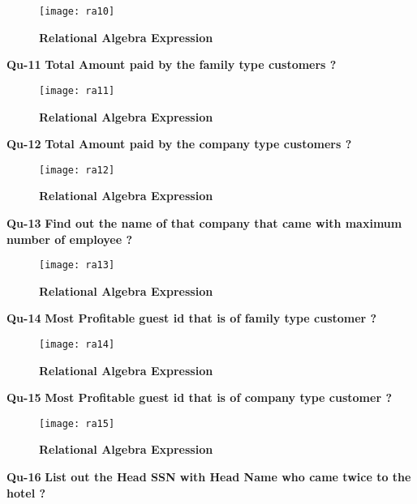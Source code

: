 \documentclass[a4,12pt]{report}
\begin{document}
\begin{figure}[hbtp]
\centering
\texttt{[image: ra10]}
\caption{\textbf{{\color{red}Relational Algebra Expression}}}
\end{figure}

\newpage
\textbf{Qu-11} \textbf{ Total Amount paid by the family type customers ? }\\

\begin{figure}[hbtp]
\centering
\texttt{[image: ra11]}
\caption{\textbf{{\color{red}Relational Algebra Expression}}}
\end{figure}

\newpage
\textbf{Qu-12} \textbf{ Total Amount paid by the company type customers ? }\\

\begin{figure}[hbtp]
\centering
\texttt{[image: ra12]}
\caption{\textbf{{\color{red}Relational Algebra Expression}}}
\end{figure}

\textbf{Qu-13} \textbf{ Find out the name of that company that came with maximum number of employee ? }\\

\begin{figure}[hbtp]
\centering
\texttt{[image: ra13]}
\caption{\textbf{{\color{red}Relational Algebra Expression}}}
\end{figure}

\newpage
\textbf{Qu-14} \textbf{ Most Profitable guest id that is of family type customer ? }\\

\begin{figure}[hbtp]
\centering
\texttt{[image: ra14]}
\caption{\textbf{{\color{red}Relational Algebra Expression}}}
\end{figure}

\textbf{Qu-15} \textbf{ Most Profitable guest id that is of company type customer ? }\\

\begin{figure}[hbtp]
\centering
\texttt{[image: ra15]}
\caption{\textbf{{\color{red}Relational Algebra Expression}}}
\end{figure}

\newpage
\textbf{Qu-16} \textbf{ List out the Head SSN with Head Name who came twice to the hotel ? }\\
\end{document}
